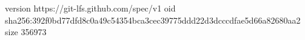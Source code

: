 version https://git-lfs.github.com/spec/v1
oid sha256:392f0bd77dfd8c0a49c54354bca3cec39775ddd22d3dcccdfae5d66a82680aa2
size 356973
